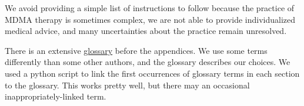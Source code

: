 \documentclass[12pt,letterpaper]{book}
\begin{document}
We avoid providing a simple list of instructions to follow because the practice of MDMA therapy is sometimes complex, we are not able to provide individualized medical advice, and many uncertainties about the practice remain unresolved.

There is an extensive \hyperref[sec:glossary]{glossary} before the appendices. We use some terms differently than some other authors, and the glossary describes our choices. We used a python script to link the first occurrences of glossary terms in each section to the glossary. This works pretty well, but there may an occasional inappropriately-linked term.

\end{document}
